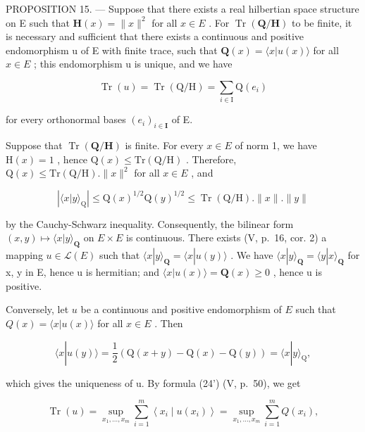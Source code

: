 PROPOSITION 15. --- Suppose that there exists a real hilbertian space structure on E such that \(\mathbf{H}(x) = \|x\|^2\) for all \(x \in E\) . For \(\operatorname{Tr}(\mathbf{Q}/\mathbf{H})\) to be finite, it is necessary and sufficient that there exists a continuous and positive endomorphism u of E with finite trace, such that \(\mathbf{Q}(x) = \langle x|u(x) \rangle\) for all \(x \in E\) ; this endomorphism u is unique, and we have

\[
\operatorname{Tr} (u) = \operatorname{Tr} (\mathrm{Q} / \mathrm{H}) = \sum_ {i \in \mathrm{I}} \mathrm{Q} \left(e _ {i}\right)\tag{44}
\]

for every orthonormal bases \((e_i)_{i\in \mathbf{I}}\) of E.

Suppose that \(\operatorname{Tr}(\mathbf{Q} / \mathbf{H})\) is finite. For every \(x\in E\) of norm 1, we have \(\mathrm{H}(x) = 1\) , hence \(\mathrm{Q}(x)\leqslant \mathrm{Tr}(\mathrm{Q} / \mathrm{H})\) . Therefore, \(\mathrm{Q}(x)\leqslant \mathrm{Tr}(\mathrm{Q} / \mathrm{H}).\| x\|^2\) for all \(x\in E\) , and

\[
\left| \langle x | y \rangle_ {\mathrm{Q}} \right| \leqslant \mathrm{Q} (x) ^ {1 / 2} \mathrm{Q} (y) ^ {1 / 2} \leqslant \operatorname{Tr} (\mathrm{Q} / \mathrm{H}). \| x \|. \| y \|
\]

by the Cauchy-Schwarz inequality. Consequently, the bilinear form \((x,y)\mapsto\langle x|y\rangle_{\mathbf{Q}}\) on \(E\times E\) is continuous. There exists (V, p.~16, cor. 2) a mapping \(u\in\mathcal{L}(E)\) such that \(\langle x|y\rangle_{\mathbf{Q}}=\langle x|u(y)\rangle\) . We have \(\langle x|y\rangle_{\mathbf{Q}}=\langle y|x\rangle_{\mathbf{Q}}\) for x, y in E, hence u is hermitian; and \(\langle x|u(x)\rangle=\mathbf{Q}(x)\geqslant0\) , hence u is positive.

Conversely, let \(u\) be a continuous and positive endomorphism of \(E\) such that \(Q(x) = \langle x|u(x) \rangle\) for all \(x \in E\) . Then

\[
\langle x | u (y) \rangle = \frac {1}{2} (\mathrm{Q} (x + y) - \mathrm{Q} (x) - \mathrm{Q} (y)) = \langle x | y \rangle_ {\mathrm{Q}},
\]

which gives the uniqueness of u. By formula (24') (V, p.~50), we get

\[
\operatorname{Tr} (u) = \sup _ {x _ {1}, \dots , x _ {m}} \sum_ {i = 1} ^ {m} \left\langle x _ {i} \mid u \left(x _ {i}\right) \right\rangle = \sup _ {x _ {1}, \dots , x _ {m}} \sum_ {i = 1} ^ {m} Q \left(x _ {i}\right),
\]

